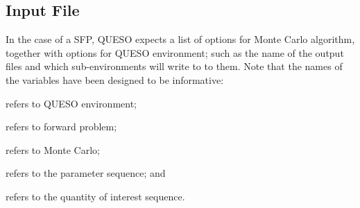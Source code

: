 











\subsection{Input File}\label{sec:sfp-input-file}

In the case of a SFP, QUESO expects a list of options for Monte Carlo algorithm,
together with options for QUESO environment; such as the name of the output files and which sub-environments will write to to them.
Note that the names of the variables have been designed to be informative:
\begin{description}\vspace{-8pt}
\item[ \texttt{env}:] refers to QUESO environment; \vspace{-8pt}
\item[ \texttt{fp}:] refers to forward problem;\vspace{-8pt}
\item[ \texttt{mc}:] refers to Monte Carlo;\vspace{-8pt}
\item[ \texttt{pseq}:] refers to the parameter sequence; and\vspace{-8pt}
\item[ \texttt{qseq}:] refers to the quantity of interest sequence.
\end{description}

